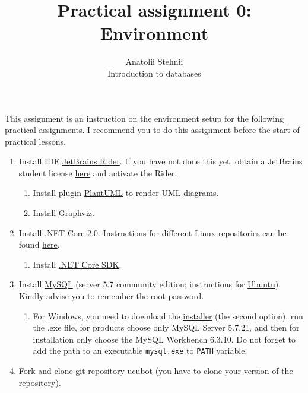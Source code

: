 \documentclass[12pt]{article}
\newcommand{\code}[1]{\texttt{#1}}
\begin{document}
\title{Practical assignment 0: Environment}
\author{Anatolii Stehnii\\Introduction to databases}
\maketitle

This assignment is an instruction on the environment setup for the following practical assignments. I recommend you to do this assignment before the start of practical lessons.

\begin{enumerate}
\item Install IDE \href{https://www.jetbrains.com/rider/download/}{JetBrains Rider}. If you have not done this yet, obtain a JetBrains student license \href{https://www.jetbrains.com/student/}{here} and activate the Rider.
\begin{enumerate}
\item Install plugin \href{https://plugins.jetbrains.com/plugin/7017-plantuml-integration}{PlantUML} to render UML diagrams.
\item Install \href{http://www.graphviz.org/download/}{Graphviz}.
\end{enumerate}
\item Install \href{https://www.microsoft.com/net/learn/get-started}{.NET Core 2.0}. Instructions for different Linux repositories can be found  \href{https://docs.microsoft.com/ru-ru/dotnet/core/linux-prerequisites?tabs=netcore2x}{here}.
\begin{enumerate}
\item Install \href{https://github.com/dotnet/core/blob/master/release-notes/download-archives/1.0.4-sdk-download.md}{.NET Core SDK}.
\end{enumerate}
\item Install \href{https://www.mysql.com/}{MySQL} (server 5.7 community edition; instructions for \href{https://www.digitalocean.com/community/tutorials/how-to-install-mysql-on-ubuntu-16-04}{Ubuntu}). Kindly advise you to remember the root password.
\begin{enumerate}
\item For Windows, you need to download the \href{https://dev.mysql.com/downloads/installer/}{installer} (the second option), run the .exe file, for products choose only MySQL Server 5.7.21, and then for installation only choose the MySQL Workbench 6.3.10. Do not forget to add the path to an executable \code{mysql.exe} to \code{PATH} variable.
\end{enumerate}
\item Fork and clone git repository \href{https://github.com/tsdaemon/ucubot}{ucubot} (you have to clone your version of the repository).

\end{enumerate}
\end{document}
